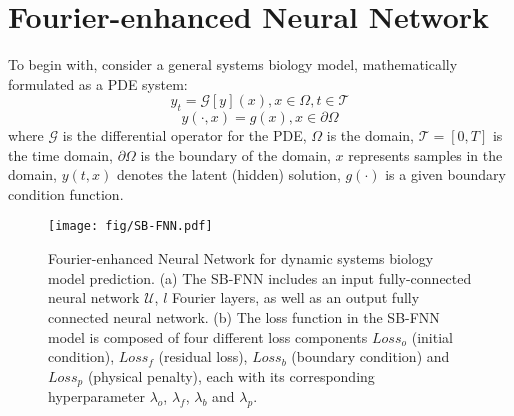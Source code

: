 \label{cha:method}









\section{Fourier-enhanced Neural Network}
\label{cha:fnn}

 
To begin with, consider a general systems biology model, mathematically formulated as a PDE system:
\begin{equation}
y_{t}=\mathcal{G}\left[y\right](x), x\in \Omega,t\in \mathcal{T}
\end{equation}
\begin{equation}
y\left(\cdot, x\right) = g\left(x\right), x\in \partial\Omega
\end{equation}
where $\mathcal{G}$ is the differential operator for the PDE, $\Omega$ is the domain, $\mathcal{T}=\left[0,T\right]$ is the time domain, $\partial\Omega$ is the boundary of the domain, $x$ represents samples in the domain, $y\left(t,x\right)$ denotes the latent (hidden) solution, $g\left(\cdot\right)$ is a given boundary condition function.

\begin{figure}[h]
\centering
\texttt{[image: fig/SB-FNN.pdf]}
\caption[Fourier-enhanced Neural Network for dynamic systems biology model prediction] {Fourier-enhanced Neural Network for dynamic systems biology model prediction. (a) The SB-FNN includes an input fully-connected neural network $\mathcal{U}$, $l$ Fourier layers, as well as an output fully connected neural network. (b) The loss function in the SB-FNN model is composed of four different loss components $Loss_{o}$ (initial condition), $Loss_{f}$ (residual loss), $Loss_{b}$ (boundary condition) and $Loss_{p}$ (physical penalty), each with its corresponding hyperparameter $\lambda_o$, $\lambda_f$, $\lambda_b$ and $\lambda_p$.}
\label{fig:SB-FNN}
\end{figure}

